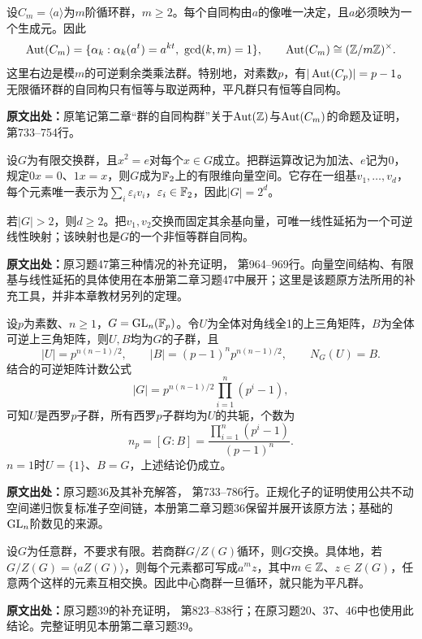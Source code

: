 \begin{reviewprop}[循环群的自同构]\label{tool:a-cycle-automorphisms}
设$C_m=\langle a\rangle$为$m$阶循环群，$m\ge2$。每个自同构由$a$的像唯一决定，且$a$必须映为一个生成元。因此
\[
\Aut(C_m)=\{\alpha_k:\alpha_k(a^t)=a^{kt},\ \gcd(k,m)=1\},
\qquad
\Aut(C_m)\cong(\Z/m\Z)^\times.
\]
这里右边是模$m$的可逆剩余类乘法群。特别地，对素数$p$，有$|\operatorname{Aut}(C_p)|=p-1$。无限循环群的自同构只有恒等与取逆两种，平凡群只有恒等自同构。

\textbf{原文出处：}原笔记第二章“群的自同构群”关于$\operatorname{Aut}(\mathbb Z)$与$\operatorname{Aut}(C_m)$的命题及证明， 第733--754行。
\end{reviewprop}

\begin{reviewlemma}\label{tool:a-binary-basis-swap}
设$G$为有限交换群，且$x^2=e$对每个$x\in G$成立。把群运算改记为加法、$e$记为0，规定$0x=0$、$1x=x$，则$G$成为$\mathbb F_2$上的有限维向量空间。它存在一组基$v_1,\ldots,v_d$，每个元素唯一表示为$\sum_i\varepsilon_iv_i$，$\varepsilon_i\in\mathbb F_2$，因此$|G|=2^d$。

若$|G|>2$，则$d\ge2$。把$v_1,v_2$交换而固定其余基向量，可唯一线性延拓为一个可逆线性映射；该映射也是$G$的一个非恒等群自同构。

\textbf{原文出处：}原习题47第三种情况的补充证明， 第964--969行。向量空间结构、有限基与线性延拓的具体使用在本册第二章习题47中展开；这里是该题原方法所用的补充工具，并非本章教材另列的定理。
\end{reviewlemma}

\begin{reviewprop}[一般线性群中的单位上三角西罗子群（补充）]\label{tool:a-gl-sylow}
设$p$为素数、$n\ge1$，$G=\operatorname{GL}_n(\mathbb F_p)$。令$U$为全体对角线全1的上三角矩阵，$B$为全体可逆上三角矩阵，则$U,B$均为$G$的子群，且
\[
|U|=p^{n(n-1)/2},\qquad
|B|=(p-1)^np^{n(n-1)/2},\qquad
N_G(U)=B.
\]
结合的可逆矩阵计数公式
\[
|G|=p^{n(n-1)/2}\prod_{i=1}^n(p^i-1),
\]
可知$U$是西罗$p$子群，所有西罗$p$子群均为$U$的共轭，个数为
\[
n_p=[G:B]=\frac{\prod_{i=1}^n(p^i-1)}{(p-1)^n}.
\]
$n=1$时$U=\{1\}$、$B=G$，上述结论仍成立。

\textbf{原文出处：}原习题36及其补充解答， 第733--786行。正规化子的证明使用公共不动空间递归恢复标准子空间链，本册第二章习题36保留并展开该原方法；基础的$\operatorname{GL}_n$阶数见的来源。
\end{reviewprop}

\begin{reviewprop}[中心商群循环则原群交换]\label{tool:a-center-quotient}
设$G$为任意群，不要求有限。若商群$G/Z(G)$循环，则$G$交换。具体地，若$G/Z(G)=\langle aZ(G)\rangle$，则每个元素都可写成$a^mz$，其中$m\in\mathbb Z$、$z\in Z(G)$，任意两个这样的元素互相交换。因此中心商群一旦循环，就只能为平凡群。

\textbf{原文出处：}原习题39的补充证明， 第823--838行；在原习题20、37、46中也使用此结论。完整证明见本册第二章习题39。
\end{reviewprop}

